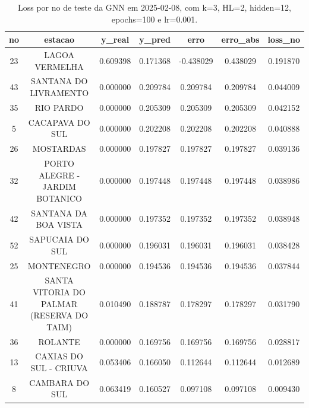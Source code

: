 \begin{table}[h]
\centering
\caption{Loss por no de teste da GNN em 2025-02-08, com k=3, HL=2, hidden=12, epochs=100 e lr=0.001.}
\label{tab:gnn_loss_k3_hl2_h12_e100_d20250208}
\begin{tabular}{ccccccc}
\toprule
no & estacao & y\_real & y\_pred & erro & erro\_abs & loss\_no \\
\midrule
23 & LAGOA VERMELHA & 0.609398 & 0.171368 & -0.438029 & 0.438029 & 0.191870 \\
43 & SANTANA DO LIVRAMENTO & 0.000000 & 0.209784 & 0.209784 & 0.209784 & 0.044009 \\
35 & RIO PARDO & 0.000000 & 0.205309 & 0.205309 & 0.205309 & 0.042152 \\
5 & CACAPAVA DO SUL & 0.000000 & 0.202208 & 0.202208 & 0.202208 & 0.040888 \\
26 & MOSTARDAS & 0.000000 & 0.197827 & 0.197827 & 0.197827 & 0.039136 \\
32 & PORTO ALEGRE - JARDIM BOTANICO & 0.000000 & 0.197448 & 0.197448 & 0.197448 & 0.038986 \\
42 & SANTANA DA BOA VISTA & 0.000000 & 0.197352 & 0.197352 & 0.197352 & 0.038948 \\
52 & SAPUCAIA DO SUL & 0.000000 & 0.196031 & 0.196031 & 0.196031 & 0.038428 \\
25 & MONTENEGRO & 0.000000 & 0.194536 & 0.194536 & 0.194536 & 0.037844 \\
41 & SANTA VITORIA DO PALMAR (RESERVA DO TAIM) & 0.010490 & 0.188787 & 0.178297 & 0.178297 & 0.031790 \\
36 & ROLANTE & 0.000000 & 0.169756 & 0.169756 & 0.169756 & 0.028817 \\
13 & CAXIAS DO SUL - CRIUVA & 0.053406 & 0.166050 & 0.112644 & 0.112644 & 0.012689 \\
8 & CAMBARA DO SUL & 0.063419 & 0.160527 & 0.097108 & 0.097108 & 0.009430 \\
\bottomrule
\end{tabular}
\end{table}
